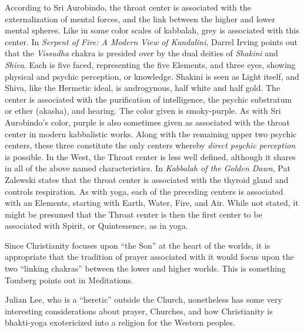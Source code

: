 \begin{quotex}
According to Sri Aurobindo, the throat center is associated with the externalization of mental forces, and the link between the higher and lower mental spheres. Like in some color scales of kabbalah, grey is associated with this center. In \textit{Serpent of Fire: A Modern View of Kundalini}, Darrel Irving points out that the \textit{Vissudha} chakra is presided over by the dual deities of \textit{Shakini} and \textit{Shiva}. Each is five faced, representing the five Elements, and three eyes, showing physical and psychic perception, or knowledge. Shakini is seen as Light itself, and Shiva, like the Hermetic ideal, is androgynous, half white and half gold. The center is associated with the purification of intelligence, the psychic substratum or ether (akasha), and hearing. The color given is smoky-purple. As with Sri Aurobindo’s color, purple is also sometimes given as associated with the throat center in modern kabbalistic works. Along with the remaining upper two psychic centers, these three constitute the only centers whereby \textit{direct psychic perception} is possible. In the West, the Throat center is less well defined, although it shares in all of the above named characteristics. In \textit{Kabbalah of the Golden Dawn}, Pat Zalewski states that the throat center is associated with the thyroid gland and controls respiration. As with yoga, each of the preceding centers is associated with an Elements, starting with Earth, Water, Fire, and Air. While not stated, it might be presumed that the Throat center is then the first center to be associated with Spirit, or Quintessence, as in yoga.
\end{quotex}

Since Christianity focuses upon “the Son” at the heart of the worlds, it is appropriate that the tradition of prayer associated with it would focus upon the two “linking chakras” between the lower and higher worlds. This is something Tomberg points out in Meditations.

Julian Lee, who is a “heretic” outside the Church, nonetheless has some very interesting considerations about prayer, Churches, and how Christianity is bhakti-yoga exotericized into a religion for the Western peoples.

